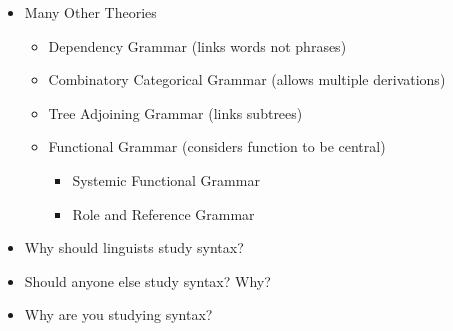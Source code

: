 \documentclass[a4paper,landscape,headrule,footrule]{foils}
\begin{document}
  \begin{tree}\tiny
    { {
        {}}}
     
  \end{tree}
\vspace*{-2em}
  \begin{small}
    \begin{itemize}
    \item Many Other Theories
      \begin{itemize}
      \item Dependency Grammar  (links words not phrases)
      \item Combinatory Categorical Grammar (allows multiple derivations)
      \item Tree Adjoining Grammar (links subtrees)
      \item Functional Grammar (considers function to be central)
        \begin{itemize}
        \item Systemic Functional Grammar
        \item Role and Reference Grammar
        \end{itemize}
      \end{itemize}
    \end{itemize}
  \end{small}



\begin{itemize}
\item Why should linguists study syntax?

\item Should anyone else study syntax? Why?
\item Why are you studying syntax?
\end{itemize}
\end{document}
